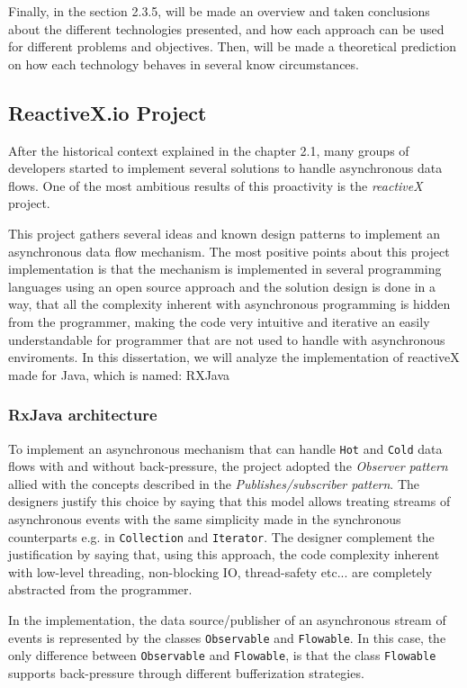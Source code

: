 Finally, in the section 2.3.5, will be made an overview and taken conclusions about the different technologies presented, and how each approach can be used for different problems and objectives. Then, will be made a theoretical prediction on how each technology behaves in several know circumstances. 

\subsection{ReactiveX.io Project}
\label{reactivex}

After the historical context explained in the chapter 2.1, many groups of developers started to implement several solutions to handle asynchronous data flows. One of the most ambitious results of this proactivity is the \textit{reactiveX} project.

This project gathers several ideas and known design patterns to implement an asynchronous data flow mechanism. 
The most positive points about this project implementation is that the mechanism is implemented in several programming languages using an open source approach and the solution design is done in a way, that all the complexity inherent with asynchronous programming is hidden from the programmer, making the code very intuitive and iterative an easily understandable for programmer that are not used to handle with asynchronous enviroments. 
In this dissertation, we will analyze the implementation of reactiveX made for Java, which is named: RXJava
\clearpage
\subsubsection{RxJava architecture}
\label{rxjava}
To implement an asynchronous mechanism that can handle \texttt{Hot} and \texttt{Cold} data flows with and without back-pressure, the project adopted the \textit{Observer pattern} allied with the concepts described in the \textit{Publishes/subscriber pattern}.
The designers justify this choice by saying that this model allows treating streams of asynchronous events with the same simplicity made in the synchronous counterparts e.g. in \texttt{Collection} and \texttt{Iterator}. The designer complement the justification by saying that, using this approach, the code complexity inherent with low-level threading, non-blocking IO, thread-safety etc... are completely abstracted from the programmer.

In the implementation, the data source/publisher of an asynchronous stream of events is represented by the classes \texttt{Observable} and \texttt{Flowable}. In this case, the only difference between \texttt{Observable} and \texttt{Flowable}, is that the class \texttt{Flowable} supports back-pressure through different bufferization strategies.

